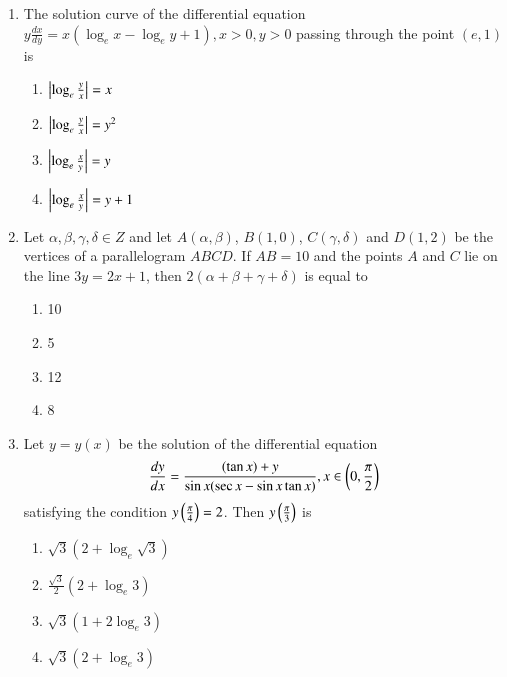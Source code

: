 \documentclass[journal]{IEEEtran}
\begin{document}
\begin{enumerate}
    \item The solution curve of the differential equation $y\frac{dx}{dy}
    = x(\log_e x - \log_e y + 1), x > 0, y > 0$ passing through the point
    $(e, 1)$ is

    \begin{multicols}{4}
\begin{enumerate}

        \item $\left\vert\log_e \frac{y}{x}\right\vert = x$
        \item $\left\vert\log_e \frac{y}{x}\right\vert = y^2$
        \item $\left\vert\log_e \frac{x}{y}\right\vert = y$
        \item $\left\vert\log_e \frac{x}{y}\right\vert = y + 1$
    \end{enumerate}
\end{multicols}

    \item Let $\alpha,\beta,\gamma,\delta \in Z$ and let $A(\alpha,\beta)$,
    $B(1, 0)$, $C(\gamma,\delta)$ and $D(1, 2)$ be the
    vertices of a parallelogram $ABCD$. If $AB = 10$ and the points
    $A$ and $C$ lie on the line $3y = 2x + 1$, then
    $2(\alpha + \beta + \gamma + \delta)$ is equal to

    \begin{multicols}{4}
\begin{enumerate}

        \item 10
        \item 5
        \item 12
        \item 8
    \end{enumerate}
\end{multicols}

    \item Let $y = y(x)$ be the solution of the differential equation
    $$
    \frac{dy}{dx} = \frac{(\tan x) + y}{\sin x(\sec x - \sin x \tan x)},
    x \in \left(0, \frac{\pi}{2}\right)
    $$
    satisfying the condition $y\left(\frac{\pi}{4}\right) = 2$.
    Then $y\left(\frac{\pi}{3}\right)$ is

    \begin{multicols}{4}
\begin{enumerate}

        \item $\sqrt{3}(2 + \log_e \sqrt{3})$
        \item $\frac{\sqrt{3}}{2}(2 + \log_e 3)$
        \item $\sqrt{3}(1 + 2 \log_e 3)$
        \item $\sqrt{3}(2 + \log_e 3)$
    \end{enumerate}
\end{multicols}


\end{enumerate}
\end{document}
